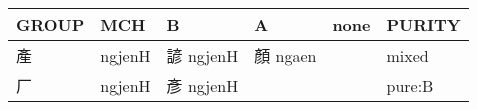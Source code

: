 \documentclass[14pt,a4paper]{scrartcl}
\begin{document}
\begin{longtable}[c]{@{}llllll@{}}
\toprule
\begin{minipage}[b]{0.14\columnwidth}\raggedright\strut
GROUP
\strut\end{minipage} &
\begin{minipage}[b]{0.14\columnwidth}\raggedright\strut
MCH
\strut\end{minipage} &
\begin{minipage}[b]{0.14\columnwidth}\raggedright\strut
B
\strut\end{minipage} &
\begin{minipage}[b]{0.14\columnwidth}\raggedright\strut
A
\strut\end{minipage} &
\begin{minipage}[b]{0.14\columnwidth}\raggedright\strut
none
\strut\end{minipage} &
\begin{minipage}[b]{0.14\columnwidth}\raggedright\strut
PURITY
\strut\end{minipage}\tabularnewline
\midrule
\endhead
\begin{minipage}[t]{0.14\columnwidth}\raggedright\strut
產
\strut\end{minipage} &
\begin{minipage}[t]{0.14\columnwidth}\raggedright\strut
ngjenH
\strut\end{minipage} &
\begin{minipage}[t]{0.14\columnwidth}\raggedright\strut
諺 ngjenH
\strut\end{minipage} &
\begin{minipage}[t]{0.14\columnwidth}\raggedright\strut
顏 ngaen
\strut\end{minipage} &
\begin{minipage}[t]{0.14\columnwidth}\raggedright\strut
\strut\end{minipage} &
\begin{minipage}[t]{0.14\columnwidth}\raggedright\strut
mixed
\strut\end{minipage}\tabularnewline
\begin{minipage}[t]{0.14\columnwidth}\raggedright\strut
厂
\strut\end{minipage} &
\begin{minipage}[t]{0.14\columnwidth}\raggedright\strut
ngjenH
\strut\end{minipage} &
\begin{minipage}[t]{0.14\columnwidth}\raggedright\strut
彥 ngjenH
\strut\end{minipage} &
\begin{minipage}[t]{0.14\columnwidth}\raggedright\strut
\strut\end{minipage} &
\begin{minipage}[t]{0.14\columnwidth}\raggedright\strut
\strut\end{minipage} &
\begin{minipage}[t]{0.14\columnwidth}\raggedright\strut
pure:B
\strut\end{minipage}\tabularnewline
\bottomrule
\end{longtable}
\end{document}
